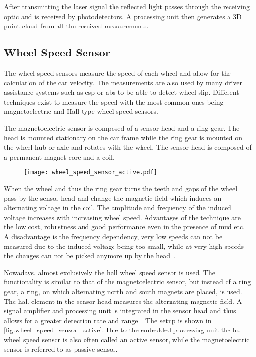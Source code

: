 After transmitting the laser signal the reflected light passes through the receiving optic and is received by photodetectors.
A processing unit then generates a 3D point cloud from all the received measurements.


\subsection{Wheel Speed Sensor}
The wheel speed sensors measure the speed of each wheel and allow for the calculation of the car velocity.
The measurements are also used by many driver assistance systems such as \gls{esp} or \gls{abs} to be able to detect wheel slip.
Different techniques exist to measure the speed with the most common ones being magnetoelectric and Hall type wheel speed sensors.

The magnetoelectric sensor is composed of a sensor head and a ring gear.
The head is mounted stationary on the car frame while the ring gear is mounted on the wheel hub or axle and rotates with the wheel.
The sensor head is composed of a permanent magnet core and a coil.
\begin{figure}[b]
    {\texttt{[image: wheel\_speed\_sensor\_active.pdf]}}
\end{figure}
When the wheel and thus the ring gear turns the teeth and gaps of the wheel pass by the sensor head and change the magnetic field which induces an alternating voltage in the coil.
The amplitude and frequency of the induced voltage increases with increasing wheel speed.
Advantages of the technique are the low cost, robustness and good performance even in the presence of mud etc.
A disadvantage is the frequency dependency, very low speeds can not be measured due to the induced voltage being too small, while at very high speeds the changes can not be picked anymore up by the head~\cite{AutoReif2014}.

Nowadays, almost exclusively the hall wheel speed sensor is used.
The functionality is similar to that of the magnetoelectric sensor, but instead of a ring gear, a ring, on which alternating north and south magnets are placed, is used.
The hall element in the sensor head measures the alternating magnetic field.
A signal amplifier and processing unit is integrated in the sensor head and thus allows for a greater detection rate and range~\cite{Re2011}.
The setup is shown in \cref{fig:wheel_speed_sensor_active}.
Due to the embedded processing unit the hall wheel speed sensor is also often called an active sensor, while the magnetoelectric sensor is referred to as passive sensor.



